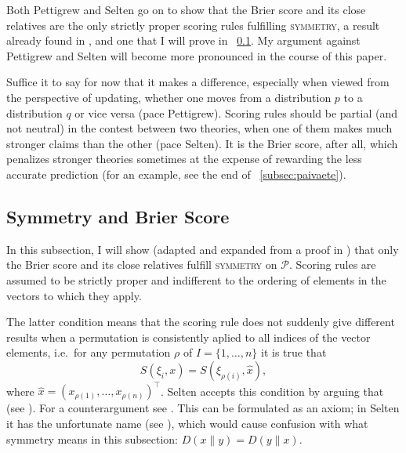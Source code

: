 \documentclass[12pt]{article}
\begin{document}
Both Pettigrew and Selten go on to show that the Brier score and its
close relatives are the only strictly proper scoring rules fulfilling
\textsc{symmetry}, a result already found in ,
and one that I will prove in {\ubsection}~\ref{subsec:ohahpaiv}. My
argument against Pettigrew and Selten will become more pronounced in
the course of this paper.

Suffice it to say for now that it makes a difference, especially when
viewed from the perspective of updating, whether one moves from a
distribution $p$ to a distribution $q$ or vice versa (pace Pettigrew).
Scoring rules should be partial (and not neutral) in the contest
between two theories, when one of them makes much stronger claims than
the other (pace Selten). It is the Brier score, after all, which
penalizes stronger theories sometimes at the expense of rewarding the
less accurate prediction (for an example, see the end of
{\ubsection}~\ref{subsec:paivaete}).

\subsection{Symmetry and Brier Score}
\label{subsec:ohahpaiv}

In this subsection, I will show (adapted and expanded from a proof
in ) that only the Brier score and its
close relatives fulfill \textsc{symmetry} on $\mathcal{P}$.
Scoring rules are assumed to be strictly proper and indifferent to
the ordering of elements in the vectors to which they apply. 

The latter condition means that the scoring rule does not suddenly
give different results when a permutation is consistently aplied to
all indices of the vector elements, i.e.\ for any permutation $\rho$
of $I=\{1,\ldots,n\}$ it is true that
\begin{equation}
  \label{eq:ooshahch}
  S(\xi_{i},x)=S(\xi_{\rho(i)},\hat{x}),
\end{equation}
where $\hat{x}=(x_{\rho(1)},{\ldots},x_{\rho(n)})^{\intercal}$. Selten
accepts this condition by arguing that  (see ).
For a counterargument see . This can be
formulated as an axiom; in Selten it has the unfortunate name
 (see ), which would
cause confusion with what symmetry means in this subsection:
$D(x\|y)=D(y\|x)$.
\end{document}
